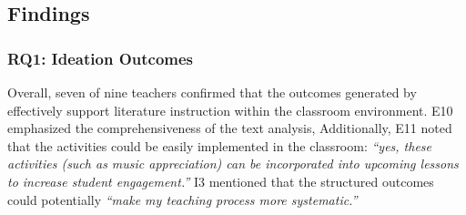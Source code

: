 



\subsection{Findings}
\subsubsection{RQ1: Ideation Outcomes}
Overall, seven of nine teachers confirmed that the outcomes generated by \name{} effectively support literature instruction within the classroom environment. E10 emphasized the comprehensiveness of the text analysis,
Additionally, E11 noted that the activities could be easily implemented in the classroom: \textit{``yes, these activities (such as music appreciation) can be incorporated into upcoming lessons to increase student engagement.''}
I3 mentioned that the structured outcomes could potentially \textit{``make my teaching process more systematic.''}

